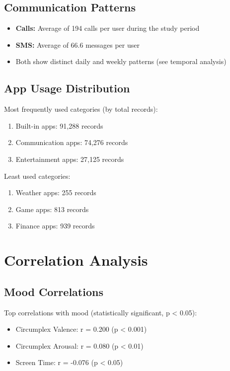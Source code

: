 \documentclass[11pt,a4paper]{article}
\begin{document}
\subsection{Communication Patterns}
\begin{itemize}
    \item \textbf{Calls:} Average of 194 calls per user during the study period
    \item \textbf{SMS:} Average of 66.6 messages per user
    \item Both show distinct daily and weekly patterns (see temporal analysis)
\end{itemize}

\subsection{App Usage Distribution}
Most frequently used categories (by total records):
\begin{enumerate}
    \item Built-in apps: 91,288 records
    \item Communication apps: 74,276 records
    \item Entertainment apps: 27,125 records
\end{enumerate}

Least used categories:
\begin{enumerate}
    \item Weather apps: 255 records
    \item Game apps: 813 records
    \item Finance apps: 939 records
\end{enumerate}

\section{Correlation Analysis}
\subsection{Mood Correlations}
Top correlations with mood (statistically significant, p < 0.05):
\begin{itemize}
    \item Circumplex Valence: r = 0.200 (p < 0.001)
    \item Circumplex Arousal: r = 0.080 (p < 0.01)
    \item Screen Time: r = -0.076 (p < 0.05)
\end{itemize}
\end{document}
